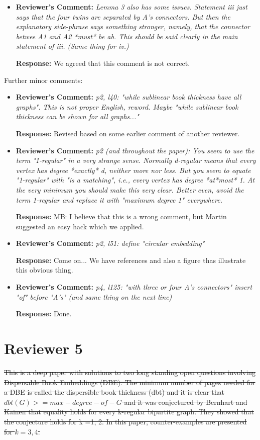 \documentclass{article}
\newcommand{\rcomment}[1]{\vspace{0.3cm} \item \textbf{Reviewer's Comment:} {\em #1}}
\newcommand{\response}{\vspace{0.2cm} \textbf{Response: }}
\begin{document}
\begin{itemize}
{\begin{itemize}
\response{We agreed that this comment is not correct.}

\rcomment{Lemma 3 also has some issues.  Statement iii just says that the four twins are separated by A's connectors.  But then the explanatory side-phrase says something stronger, namely, that the connector betwee A1 and A2 *must* be ab.    This should be said clearly in the main statement of iii.  (Same thing for iv.)}

\response{We agreed that this comment is not correct.}
\end{itemize}

Further minor comments:

\begin{itemize}
\rcomment{p2, l40: "while sublinear book thickness have all graphs". This is not proper English, reword.  Maybe "while sublinear book thickness can be shown for all graphs..."}

\response{Revised based on some earlier comment of another reviewer.}

\rcomment{p2 (and throughout the paper):  You seem to use the term "1-regular" in a very strange sense.  Normally d-regular means that every vertex has degree *exactly* d, neither more nor less.  But you seem to equate "1-regular" with "is a matching", i.e., every vertex has degree *at*most* 1.  At the very minimum you should make this very clear.  Better even, avoid the term 1-regular and replace it with "maximum degree 1" everywhere.}

\response{MB: I believe that this is a wrong comment, but Martin suggested an easy hack which we applied.}

\rcomment{p2, l51: define "circular embedding"}

\response{Come on... We have references and also a figure thas illustrate this obvious thing.}

\rcomment{p4, l125: "with three or four A's connectors" insert "of" before "A's" (and same thing on the next line)}

\response{Done.}
\end{itemize}

\newpage
\section*{Reviewer 5}

\st{This is a deep paper with solutions to two long standing open questions involving Dispersable Book Embeddings (DBE).  The minimum number of pages needed for a DBE is called the dispersible book thickness (dbt) and it is clear that $dbt(G) >= max-degree-of-G$ and it was conjectured by Bernhart and Kainen that equality holds for every k-regular bipartite graph.  They showed that the conjecture holds for k =1, 2.  In this paper, counter-examples are presented for $k = 3, 4$.}

}
\end{itemize}
\end{document}

